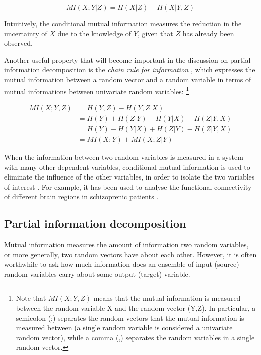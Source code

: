 \documentclass[12pt]{article}
\begin{document}
\begin{equation}
MI(X;Y|Z) = H(X|Z) - H(X|Y,Z)
\end{equation}

Intuitively, the conditional mutual information measures the reduction in the uncertainty of $X$ due to the knowledge of $Y$, given that $Z$ has already been observed. 

Another useful property that will become important in the discussion on partial information decomposition is the \textit{chain rule for information} \cite{cover-thomas}, which expresses the mutual information between a random vector and a random variable in terms of mutual informations between univariate random variables: \footnote{Note that $MI(X;Y,Z)$ means that the mutual information is measured between the random variable X and the random vector (Y,Z). In particular, a semicolon (;) separates the random vectors that the mutual information is measured between (a single random variable is considered a univariate random vector), while a comma (,) separates the random variables in a single random vector.}

\begin{equation}
\begin{split}
MI(X;Y,Z) & = H(Y,Z) - H(Y,Z|X) \\ 
		  & = H(Y) + H(Z|Y) - H(Y|X) - H(Z|Y,X) \\ 
		  & = H(Y) - H(Y|X) + H(Z|Y) - H(Z|Y,X) \\ 
		  & = MI(X;Y) + MI(X;Z|Y)
\label{eq:chain-rule-inf}
\end{split}
\end{equation}

When the information between two random variables is measured in a system with many other dependent variables, conditional mutual information is used to eliminate the influence of the other variables, in order to isolate the two variables of interest \cite{williams-beer}. For example, it has been used to analyse the functional connectivity of different brain regions in schizoprenic patients \cite{brain-cond-inf}.

\subsection{Partial information decomposition}

Mutual information measures the amount of information two random variables, or more generally, two random vectors have about each other. However, it is often worthwhile to ask how much information does an ensemble of input (source) random variables carry about some output (target) variable. 
\end{document}
